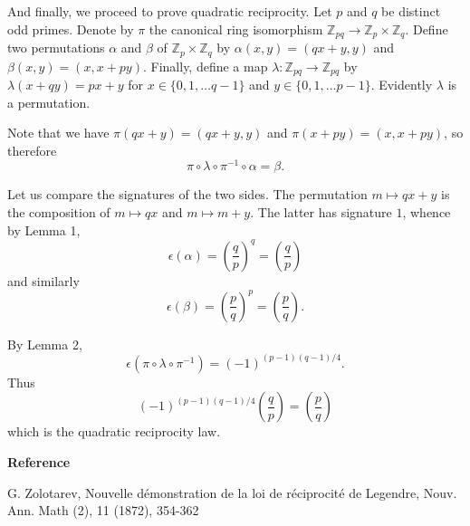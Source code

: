 \documentclass[12pt]{article}
\newcommand{\legsym}[2]{\left(\frac{#1}{#2}\right)}
\newcommand{\Zn}[1]{\mathbb{Z}_{#1}}
\begin{document}
And finally, we proceed to prove quadratic reciprocity.  Let $p$ and $q$ be distinct odd primes. Denote by $\pi$ the
canonical ring isomorphism $\Zn{pq}\to\Zn{p}\times\Zn{q}$.
Define two permutations $\alpha$ and $\beta$ of $\Zn{p}\times\Zn{q}$ by
$\alpha(x,y)=(qx+y,y)$ and $\beta(x,y)=(x,x+py).$  Finally, define a map $\lambda:\Zn{pq}\to\Zn{pq}$ by $\lambda(x+qy)=px+y$
for $x\in\{0,1,\ldots q-1\}$ and $y\in\{0,1,\ldots p-1\}$.
Evidently $\lambda$ is a permutation.

Note that we have $\pi(qx+y)=(qx+y,y)$ and $\pi(x+py)=(x,x+py)$, so
therefore
$$\pi\circ\lambda\circ\pi^{-1}\circ\alpha=\beta.$$

Let us compare the signatures of the two sides.  The permutation $m\mapsto qx+y$ is the composition of $m\mapsto qx$ and $m\mapsto m+y$. The latter has signature $1$, whence by Lemma 1, $$\epsilon(\alpha)=\legsym{q}{p}^q=\legsym{q}{p}$$
and similarly $$\epsilon(\beta)=\legsym{p}{q}^p=\legsym{p}{q}.$$

By Lemma 2,
$$\epsilon(\pi\circ\lambda\circ\pi^{-1})=(-1)^{(p-1)(q-1)/4}.$$
Thus $$(-1)^{(p-1)(q-1)/4}\legsym{q}{p}=\legsym{p}{q}$$
which is the quadratic reciprocity law.

\textbf{Reference}

G. Zolotarev, Nouvelle d\'emonstration de la loi de r\'eciprocit\'e de Legendre,
Nouv. Ann. Math (2), 11 (1872), 354-362
\end{document}
